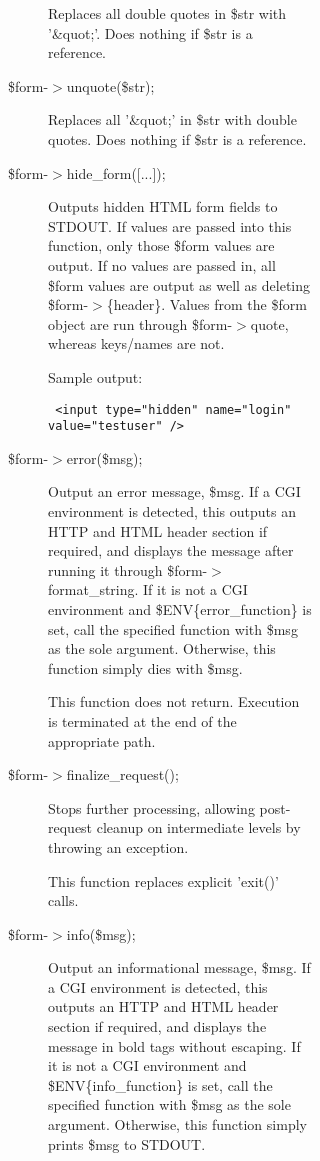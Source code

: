 \begin{description}
\begin{description}
\begin{description}
\begin{description}
\begin{description}
\begin{description}
Replaces all double quotes in \$str with '\&quot;'.  Does nothing if \$str is a
reference.


\item[{\$form-$>$unquote(\$str);}] \mbox{}

Replaces all '\&quot;' in \$str with double quotes.  Does nothing if \$str is a
reference.


\item[{\$form-$>$hide\_form([...]);}] \mbox{}

Outputs hidden HTML form fields to STDOUT.  If values are passed into this
function, only those \$form values are output.  If no values are passed in, all
\$form values are output as well as deleting \$form-$>$\{header\}.  Values from the
\$form object are run through \$form-$>$quote, whereas keys/names are not.



Sample output:

\begin{verbatim}
 <input type="hidden" name="login" value="testuser" />
\end{verbatim}

\item[{\$form-$>$error(\$msg);}] \mbox{}

Output an error message, \$msg.  If a CGI environment is detected, this outputs
an HTTP and HTML header section if required, and displays the message after
running it through \$form-$>$format\_string.  If it is not a CGI environment and
\$ENV\{error\_function\} is set, call the specified function with \$msg as the sole
argument.  Otherwise, this function simply dies with \$msg.



This function does not return.  Execution is terminated at the end of the
appropriate path.


\item[{\$form-$>$finalize\_request();}] \mbox{}

Stops further processing, allowing post-request cleanup on intermediate
levels by throwing an exception.



This function replaces explicit 'exit()' calls.


\item[{\$form-$>$info(\$msg);}] \mbox{}

Output an informational message, \$msg.  If a CGI environment is detected, this
outputs an HTTP and HTML header section if required, and displays the message
in bold tags without escaping.  If it is not a CGI environment and 
\$ENV\{info\_function\} is set, call the specified function with \$msg as the sole
argument.  Otherwise, this function simply prints \$msg to STDOUT.



\end{description}
\end{description}
\end{description}
\end{description}
\end{description}
\end{description}
